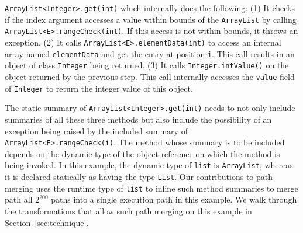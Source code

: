 {\tt ArrayList<Integer>.get(int)} which internally does the following:
%
(1) It checks if the index argument accesses a value within bounds of the {\tt ArrayList} by calling\\
{\tt ArrayList<E>.rangeCheck(int)}. If this access is not within bounds, it throws an exception.
%
(2) It calls {\tt ArrayList<E>.elementData(int)} to access an internal array named {\tt elementData} and get the
entry at position {\tt i}. This call results in an object of class {\tt Integer} being returned.
%
(3) It calls {\tt Integer.intValue()} on the object returned by the previous step. This call internally accesses
the {\tt value} field of {\tt Integer} to return the integer value of this object.
%

The static summary of {\tt ArrayList<Integer>.get(int)} needs to not only include summaries of all these three methods but
also include the possibility of an exception being raised by the included summary of {\tt ArrayList<E>.rangeCheck(i)}.
%
The method whose summary is to be included depends on the dynamic type of the object reference on which the method is being invoked.
%
In this example, the dynamic type of {\tt list} is {\tt ArrayList}, whereas it is declared statically as having the type {\tt List}.
%
Our contributions to path-merging uses the runtime type of {\tt list} to inline such method summaries to
merge path all $2^{200}$ paths into a single execution path in this example.
%
We  walk through the transformations that allow such path merging on this example in Section~\ref{sec:technique}.